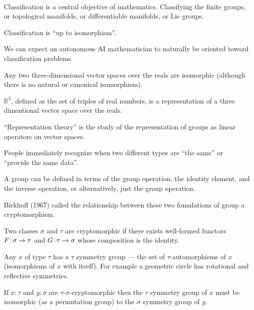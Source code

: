 {~ \hfill\unnamed
    {
    }{
      }
\hfill ~

\vfill


Classification is a central objective of mathematics.  Classifying the finite groups, or topological manifolds, or differentiable manifolds, or Lie groups.

\vfill
Classification is ``up to isomorphism''.

\vfill
We can expect an autonomous AI mathematician to naturally be oriented toward classification problems.


Any two three-dimensional vector spaces over the reals are isomorphic (although there is no natural or canonical isomorphism).

\vfill
$\mathbb{R}^3$, defined as the set of triples of real numbers, is a representation of a three dimentional vector space over the reals.

\vfill
``Representation theory'' is the study of the representation of groups as linear operators on vector spaces.


People immediately recognize when two different types are ``the same'' or ``provide the same data''.

\vfill
A group can be defined in terms of the group operation, the identity element, and the inverse operation, or alternatively, just
the group operation.

\vfill
Birkhoff (1967) called the relationship between these two fomulations of group a cryptomorphism.

\vfill
Two classes $\sigma$ and $\tau$ are cryptomorphic if there exists well-formed functors $F\!:\!\sigma \rightarrow \tau$
and $G\!:\!\tau \rightarrow \sigma$ whose composition is the identity.


Any $x$ of type $\tau$ has a $\tau$ symmetry group --- the set of $\tau$-automorphisms of $x$ (isomorphisms of $x$ with itself).  For example a geometric
circle has rotational and reflective symmetries.

\vfill
If $x\!:\!\tau$ and $y\!:\!\sigma$ are $\tau$-$\sigma$-cryptomorphic then the $\tau$ symmetry group of $x$ must be isomorphic (as a permutation group) to the $\sigma$ symmetry group of $y$.

}
